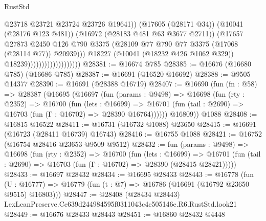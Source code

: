 \begin{lexlean}{RustStd}
\begin{coremodule}
                                                @23718
                                                @23721
                                                @23724
                                                @23726
                                                @19641))
                                            (@17605 (@28171 @34))
                                            (@10041 (@28176 @123 @481))
                                            (@16972 (@28183 @481 @63 @3677 @2711))
                                            (@17657
                                              @27873
                                              @2450
                                              @126
                                              @790
                                              @3375
                                              (@28109
                                                @77
                                                @790
                                                @77
                                                @3375
                                                (@17068 (@28114 @77))
                                                @20939)))
                                          @18227
                                          (@10041 (@18232 @426 @1062 @329))
                                          @18239)))))))))))))))))))
@28381 := @16674 @785
@28385 := @16676 (@16680 @785) (@16686 @785)
@28387 := @16691 (@16520 @16692)
@28388 := @9505 @14377
@28390 := @16691 (@28388 @16719)
@28407 := @16690
    (fun (fn : @58) =>
    @28387
      (@16695
        (@16697
          (fun (params : @9498) =>
          @16698
            (fun (rty : @2352) =>
            @16700
              (fun (lets : @16699) =>
              @16701 (fun (tail : @2690) => @16703 (fun (Γ : @16702) => @28390 @16764))))))
        @16809))
    @1088
@28408 := @16815 @16522
@28411 := @16731 (@16732 @1088) @23650
@28415 := @16691 (@16723 (@28411 @16739) @16743)
@28416 := @16755 @1088
@28421 := @16752 (@16754 @28416 @23653 @9509 @9512)
@28432 := fun (params : @9498) =>
  @16698
    (fun (rty : @2352) =>
    @16700
      (fun (lets : @16699) =>
      @16701 (fun (tail : @2690) => @16703 (fun (Γ : @16702) => @28390 (@28415 @28421)))))
@28433 := @16697 @28432
@28434 := @16695 @28433
@28443 := @16778
    (fun (U : @16777) => @16779 (fun (t : @7) => @16786 (@16691 (@16792 @23650 @9515) @16803)))
@28447 := @28408 (@28434 @28443) LexLeanPreserve.Cc639d244984595f0311043c4c505146e.R6.RustStd.look21
@28449 := @16676 @28433 @28443
@28451 := @16860 @28432 @4448

\end{coremodule}
\end{lexlean}
